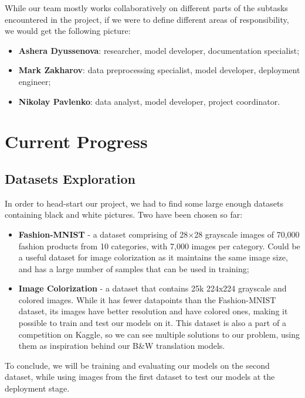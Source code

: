 \documentclass[]{article}
\begin{document}
	While our team mostly works collaboratively on different parts of the subtasks encountered in the project, if we were to define different areas of responsibility, we would get the following picture:
	
	\begin{itemize}
		\item \textbf{Ashera Dyussenova}: researcher, model developer, documentation specialist;
		\item \textbf{Mark Zakharov}: data preprocessing specialist, model developer, deployment engineer;
		\item \textbf{Nikolay Pavlenko}: data analyst, model developer, project coordinator.
	\end{itemize}
	
	\section{Current Progress}
	
	\subsection{Datasets Exploration}
	
	In order to head-start our project, we had to find some large enough datasets containing black and white pictures. Two have been chosen so far:
	
	\begin{itemize}
		\item \textbf{Fashion-MNIST} - a dataset comprising of 28×28 grayscale images of 70,000 fashion products from 10 categories, with 7,000 images per category. Could be a useful dataset for image colorization as it maintains the same image size, and has a large number of samples that can be used in training\cite{mnist};
		\item \textbf{Image Colorization} - a dataset that contains 25k 224x224 grayscale and colored images. While it has fewer datapoints than the Fashion-MNIST dataset, its images have better resolution and have colored ones, making it possible to train and test our models on it. This dataset is also a part of a competition on Kaggle, so we can see multiple solutions to our problem, using them as inspiration behind our B\&W translation models.\cite{image_colorization}
	\end{itemize}
	
	To conclude, we will be training and evaluating our models on the second dataset, while using images from the first dataset to test our models at the deployment stage.
	
\end{document}
